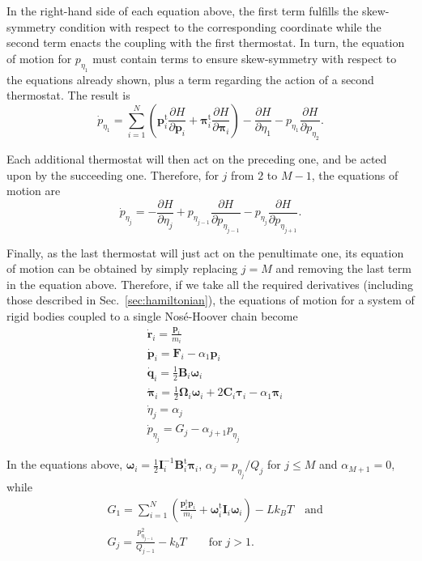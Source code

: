 \documentclass[aip,jcp,reprint,amsmath,amssymb]{revtex4-1}
\newcommand{\mt}[1]{\boldsymbol{\mathbf{#1}}}           %
\newcommand{\vt}[1]{\boldsymbol{\mathbf{#1}}}           %
\newcommand{\tr}[1]{#1^\text{t}}                        %
\newcommand{\diff}[2]{\dfrac{\partial #1}{\partial #2}} %
\begin{document}
In the right-hand side of each equation above, the first term fulfills the skew-symmetry condition with respect to the corresponding coordinate while the second term enacts the coupling with the first thermostat. In turn, the equation of motion for $p_{\eta_1}$ must contain terms to ensure skew-symmetry with respect to the equations already shown, plus a term regarding the action of a second thermostat. The result is
\[
{\dot p}_{\eta_1} = \sum_{i=1}^N \left( \tr{\vt p_i} \diff{H}{\vt p_i} + \tr{\vt \pi_i} \diff{H}{\vt \pi_i}\right) - \diff{H}{\eta_1} - p_{\eta_1} \diff{H}{p_{\eta_2}}.
\]

Each additional thermostat will then act on the preceding one, and be acted upon by the succeeding one. Therefore, for $j$ from $2$ to $M-1$, the equations of motion are
\[
{\dot p}_{\eta_j} = -\diff{H}{\eta_j} + p_{\eta_{j-1}} \diff{H}{p_{\eta_{j-1}}} - p_{\eta_j} \diff{H}{p_{\eta_{j+1}}}.
\]

Finally, as the last thermostat will just act on the penultimate one, its equation of motion can be obtained by simply replacing $j = M$ and removing the last term in the equation above. Therefore, if we take all the required derivatives (including those described in Sec.~\ref{sec:hamiltonian}), the equations of motion for a system of rigid bodies coupled to a single Nos\'{e}-Hoover chain become
\begin{subequations}
\label{eq:nhc_system}
\begin{align}
&\dot{\vt r}_i = \frac{{\vt p}_i}{m_i} \\ 
&\dot{\vt p}_i = {\vt F}_i - \alpha_1 \vt p_i \\
&\dot{\vt q}_i = \frac{1}{2} \mt B_i \vt \omega_i \label{eq:nhc_q} \\
&\dot{\vt \pi}_i = \frac{1}{2} \mt \Omega_i \vt \omega_i + 2 \mt C_i \vt \tau_i - \alpha_1 \vt \pi_i \label{eq:nhc_pi} \\
&\dot{\eta}_j = \alpha_j \\
&{\dot p}_{\eta_j} = G_j - \alpha_{j+1} p_{\eta_j}
\end{align}
\end{subequations}

In the equations above, ${\vt \omega}_i = \frac{1}{2} {\mt I}_i^{-1} \tr{\mt B}_i {\vt \pi}_i$, $\alpha_j = {p_{\eta_j}}/{Q_j}$ for $j \leq M$ and $\alpha_{M+1} = 0$, while
\begin{align*}
&G_1 = \sum_{i=1}^N \left( \frac{\tr{\vt p}_i{\vt p}_i}{m_i} + \tr{\vt \omega}_i \mt I_i \vt \omega_i \right) - L k_B T \quad \text{and}\\
&G_j = \frac{p_{\eta_{j-1}}^2}{Q_{j-1}} - k_b T \qquad \text{for} \; j > 1.
\end{align*}
\end{document}
